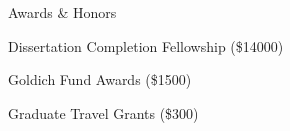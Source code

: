 \begin{cvlist}{Awards \& Honors}
    \item Dissertation Completion Fellowship (\$14000)
    \item Goldich Fund Awards (\$1500)
    \item Graduate Travel Grants (\$300)
\end{cvlist}

